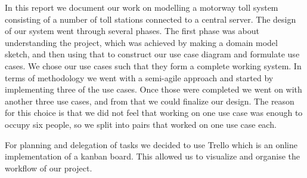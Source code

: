 
In this report we document our work on modelling a motorway toll system consisting of a number of toll stations connected to a central server. The design of our system went through several phases. The first phase was about understanding the project, which was achieved by making a domain model sketch, and then using that to construct our use case diagram and formulate use cases. We chose our use cases such that they form a complete working system. In terms of methodology we went with a semi-agile approach and started by implementing three of the use cases. Once those were completed we went on with another three use cases, and from that we could finalize our design. The reason for this choice is that we did not feel that working on one use case was enough to occupy six people, so we split into pairs that worked on one use case each.

For planning and delegation of tasks we decided to use Trello which is an online implementation of a kanban board. This allowed us to visualize and organise the workflow of our project. 